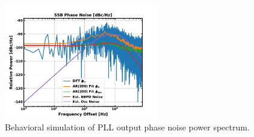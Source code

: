 
			\begin{figure}[htb!]
			    \center\includegraphics[width=0.6\textwidth, angle=0]{figs/design/pipll_pn_psd2}
			    \caption{Behavioral simulation of PLL output phase noise power spectrum.}
			    \label{fig:behav_sim_psd}
			\end{figure}



